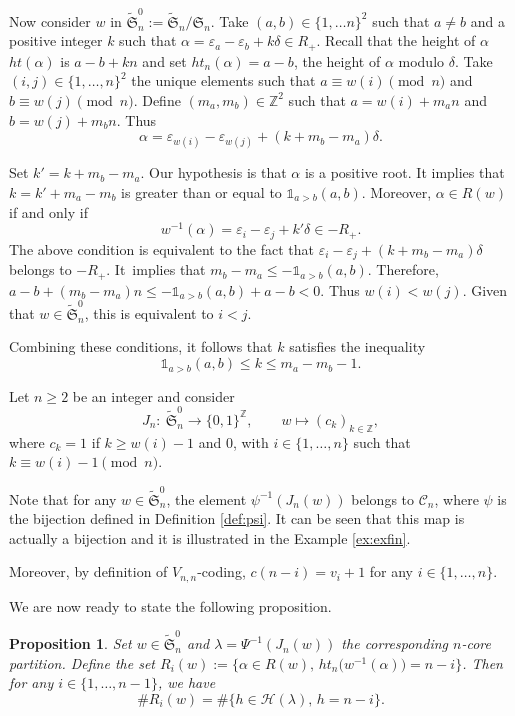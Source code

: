 \documentclass[pdftex]{sigma}
\newtheorem{Proposition}[Theorem]{Proposition}
 { \theoremstyle{definition}
\newtheorem{Definition}[Theorem]{Definition}
\newtheorem{Note}[Theorem]{Note}
\newtheorem{Example}[Theorem]{Example}
\newtheorem{Remark}[Theorem]{Remark} }
\numberwithin{equation}{section}
\def\cch{\mathcal H}
\newcommand{\Z}{\mathbb{Z}}
\begin{document}
Now consider $w$ in $\widetilde{\mathfrak{S}}^0_n:=\widetilde{\mathfrak{S}}_{n}/\mathfrak{S}_{n}$. Take $(a,b)\in\lbrace 1,\dots n\rbrace^2$ such that $a\neq b$ and a positive integer $k$ such that $\alpha=\varepsilon_a-\varepsilon_b+k\delta\in R_+$. Recall that the height of $\alpha$ $ht(\alpha)$ is $a-b+kn$ and set $ht_n(\alpha)=a-b$, the height of $\alpha$ modulo $\delta$. Take $(i,j)\in\lbrace 1,\dots,n\rbrace^2$ the unique elements such that $a\equiv w(i)\pmod{n}$ and $b\equiv w(j)\pmod{n}$. Define $(m_a,m_b)\in\Z^2$ such that $a=w(i)+m_an$ and $b=w(j)+m_bn$. Thus
\[\alpha=\varepsilon_{w(i)}-\varepsilon_{w(j)}+(k+m_b-m_a)\delta.\]

Set $k'=k+m_b-m_a$. Our hypothesis is that $\alpha$ is a positive root. It implies that $k=k'+m_a-m_b$ is greater than or equal to $\mathds{1}_{a>b}(a,b)$.
Moreover, $\alpha\in R(w)$ if and only if
\[w^{-1}(\alpha)=\varepsilon_i-\varepsilon_j+k'\delta\in -R_+.\]
The above condition is equivalent to the fact that $\varepsilon_i-\varepsilon_j+(k+m_b-m_a)\delta$ belongs to $-R_+$. It~implies that $m_b-m_a\leq -\mathds{1}_{a>b}(a,b)$. Therefore, $a-b+(m_b-m_a)n\leq-\mathds{1}_{a>b}(a,b)+a-b<0$. Thus $w(i)<w(j)$. Given that $w\in\widetilde{\mathfrak{S}}^0_n$, this is equivalent to $i<j$.

Combining these conditions, it follows that $k$ satisfies the inequality
\begin{equation}\label{eq:ineg}
\mathds{1}_{a>b}(a,b)\leq k\leq m_a-m_b-1.
\end{equation}


 Let $n \geq 2$ be an integer and consider
\[
J_n\colon \   \widetilde{\mathfrak{S}}^0_n   \to   \lbrace 0,1\rbrace^{\Z}, \qquad
  w   \mapsto   (c_k)_{k\in\Z},
\]
where $c_k=1$ if $k\geq w(i)-1$ and $0$, with $i\in\lbrace 1,\dots,n\rbrace$ such that $k\equiv w(i)-1\pmod{n}$.

Note that for any $w\in\widetilde{\mathfrak{S}}^0_n$, the element $\psi^{-1}(J_n(w))$ belongs to $\mathcal{C}_n$, where $\psi$ is the bijection defined in Definition \ref{def:psi}. It can be seen that this map is actually a bijection and it is illustrated in the Example \ref{ex:exfin}.

Moreover, by definition of $V_{n,n}$-coding, $c(n-i)=v_i+1$ for any $i\in\lbrace 1,\dots,n\rbrace$.

We are now ready to state the following proposition.
\begin{Proposition}\label{prop:inversion}
Set $w\in\widetilde{\mathfrak{S}}^0_n$ and $\lambda=\Psi^{-1}(J_n(w))$ the corresponding $n$-core partition. Define the set $R_i(w):=\bigl\lbrace \alpha\in R(w),\, ht_n\bigl(w^{-1}(\alpha)\bigr)=n-i\bigr\rbrace$.
Then for any $i\in\lbrace 1,\dots,n-1\rbrace$, we have
\[\#R_i(w)=\#\lbrace h\in \cch(\lambda),\, h=n-i\rbrace.\]
\end{Proposition}
\end{document}

